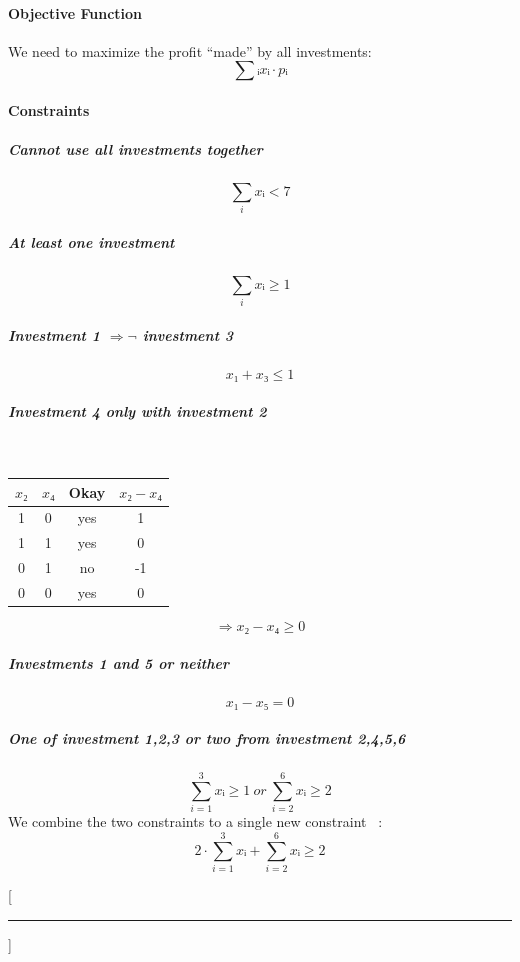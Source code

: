 \documentclass[a4paper, 12pt]{report}
\begin{document}
\paragraph{Objective Function}

We need to maximize the profit “made” by all investments:
\[
    ∑ᵢ xᵢ · pᵢ
\]

\paragraph{Constraints}

\subparagraph{Cannot use all investments together}
\[
    ∑_{i} xᵢ < 7
\]

\subparagraph{At least one investment}
\[
    ∑_{i} xᵢ ≥ 1
\]

\subparagraph{Investment 1 $⇒ ¬$ investment 3}
\[
    x₁ + x₃ ≤ 1
\]

\subparagraph{Investment 4 only with investment 2}~\\[5pt]
\begin{minipage}[t]{0.35\textwidth}
\begin{tabular}{cccc}
    $x₂$ & $x₄$ & Okay & $x₂-x₄$\\
    \hline
     1   &  0   & yes  & 1\\
     1   &  1   & yes  & 0\\
     0   &  1   & no   & -1\\
     0   &  0   & yes  & 0\\
\end{tabular}
\end{minipage}
\begin{minipage}[t]{0.35\textwidth}
\[
    ⇒ x₂ - x₄ ≥ 0
\]
\end{minipage}

\subparagraph{Investments 1 and 5 or neither}
\[
    x₁ - x₅ = 0
\]

\subparagraph{One of investment 1,2,3 or two from investment 2,4,5,6}
\[
    ∑_{i=1}^{3} xᵢ ≥ 1 ~or~ ∑_{i=2}^{6} xᵢ ≥ 2
\]
We combine the two constraints to a single new constraint
~\cite{Informatik_Forum_Or_Constraints}:
\[
     2·∑_{i=1}^{3} xᵢ + ∑_{i=2}^{6} xᵢ ≥ 2
\]


\newpage
\titleformat{\chapter}{\sffamily\bfseries}{}{0pt}{}[{\color{aqua}\hrule}]
\printbibliography
\end{document}
